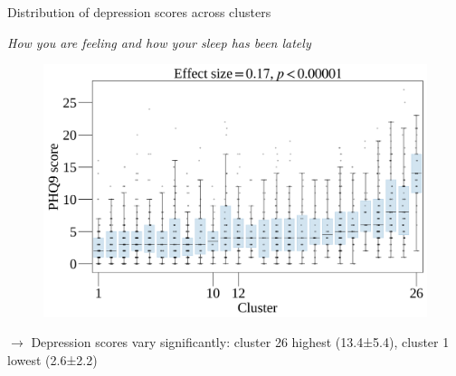 \documentclass[handout,10pt]{beamer}
\begin{document}
\begin{frame}{Distribution of depression scores across clusters}

  \textit{How you are feeling and how your sleep has been lately}%
  \begin{figure}
    \centering
    \includegraphics[scale=0.06]{img/topic_modeling/boxplot_description/popgen_description_larger_boxplots.png}
    \label{fig:popgen_description}
\end{figure}


\pause

$\rightarrow$ Depression scores vary significantly: cluster 26 highest (13.4±5.4), cluster 1 lowest (2.6±2.2)




\end{frame}
\end{document}
